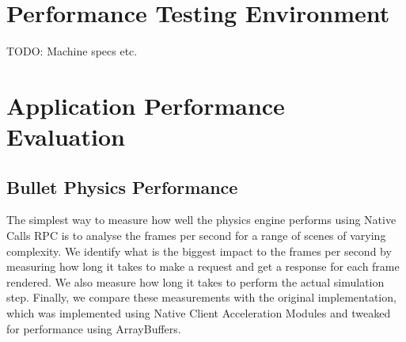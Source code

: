 \section{Performance Testing Environment} %
\label{sec:performance_testing_environment}
TODO: Machine specs etc.

\section{Application Performance Evaluation} %
\label{sec:application_performance_evaluation}
\subsection{Bullet Physics Performance} %
\label{sub:bullet_physics_performance}
The simplest way to measure how well the physics engine performs using Native Calls RPC is to analyse the frames per second for a range of scenes of varying complexity. We identify what is the biggest impact to the frames per second by measuring how long it takes to make a request and get a response for each frame rendered. We also measure how long it takes to perform the actual simulation step. Finally, we compare these measurements with the original implementation, which was implemented using Native Client Acceleration Modules and tweaked for performance using ArrayBuffers.

